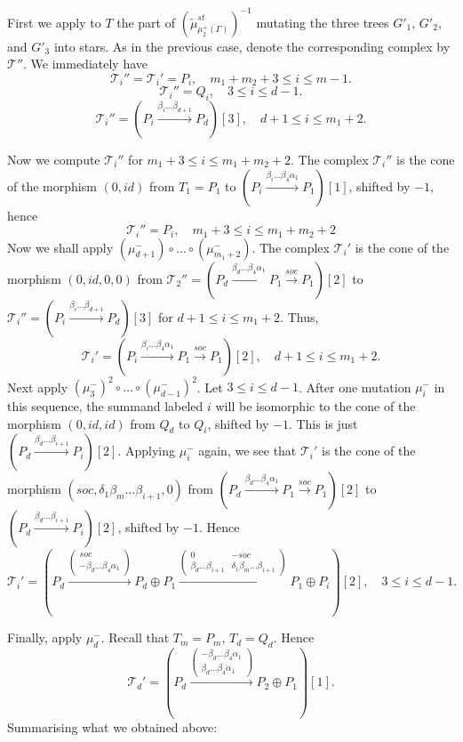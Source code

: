 \documentclass[12pt]{amsart}
\theoremstyle{plain}
\theoremstyle{remark}
\theoremstyle{definition}
\begin{document}
\begin{enumerate}
\begin{enumerate}
     First we apply to $T$ the part of $(\widetilde{\mu}_{\mu_2^+(\Gamma)}^{st})^{-1}$ mutating the three trees $G'_1$, $G'_2$, and $G'_3$ into stars. As in the previous case, denote the corresponding complex by $\mathcal{T}''$. We immediately have
     $$\mathcal{T}_i'' = \mathcal{T}_i' = P_i, \quad m_1+m_2+3 \leq i \leq m-1. $$
     $$\mathcal{T}_i'' = Q_i, \quad 3 \leq i \leq d-1. $$
     $$\mathcal{T}_i'' = (P_i \xrightarrow{\beta_i \dots \beta_{d+1}} P_d)[3], \quad d+1 \leq i \leq m_1+2.$$
    
Now we compute $\mathcal{T}_i''$ for $m_1+3 \leq i \leq m_1 + m_2+2$. The complex $\mathcal{T}_{i}''$ is the cone of the morphism $(0, id)$ from $T_1 = P_1$ to $(P_i \xrightarrow{\beta_i \dots \beta_4\alpha_1} P_1)[1]$, shifted by $-1$, hence 
$$\mathcal{T}_i'' = P_i, \quad m_1+3 \leq i \leq m_1+m_2+2 $$
Now we shall apply $(\mu_{d+1}^-) \circ \dots \circ (\mu_{m_1+2}^-)$. The complex
$\mathcal{T}_i'$ is the cone of the morphism $(0, id, 0, 0)$ from ${\mathcal{T}_{2}'' = (P_d \xrightarrow{\beta_d \dots \beta_4\alpha_1} P_1 \xrightarrow{soc} P_1)[2]}$ to ${\mathcal{T}_i'' = (P_i \xrightarrow{\beta_i \dots \beta_{d+1}} P_d)[3]}$ for ${d+1 \leq i \leq m_1+2}$. Thus,
$$\mathcal{T}_i' = (P_i \xrightarrow{\beta_i \dots \beta_4 \alpha_1} P_1 \xrightarrow{soc} P_1)[2], \quad d+1 \leq i \leq m_1+2. $$
Next apply $(\mu_3^-)^2 \circ \dots \circ (\mu_{d-1}^-)^2$. Let $3 \leq i \leq d-1$. After one  mutation $\mu_i^{-}$ in this sequence, the summand labeled $i$ will be isomorphic to the cone of the morphism $(0,id,id)$ from $Q_d$ to $Q_i$, shifted by $-1$. This is just $(P_d \xrightarrow{\beta_d \dots \beta_{i+1}} P_i)[2]$. Applying $\mu_i^-$ again, we see that $\mathcal{T}_i'$ is the cone of the morphism $(soc,\delta_1\beta_m\dots\beta_{i+1},0)$ from $(P_d \xrightarrow{\beta_d \dots \beta_{4}\alpha_1} P_1 \xrightarrow{soc} P_1)[2]$ to $(P_d \xrightarrow{\beta_d \dots \beta_{i+1}} P_i)[2]$, shifted by $-1$. 
Hence 
$$\mathcal{T}_i' = (P_d \xrightarrow{\begin{pmatrix} soc \\ -\beta_d \dots \beta_{4}\alpha_1 \end{pmatrix}} P_d \oplus P_1 \xrightarrow{\begin{pmatrix} 0 & -soc  \\ \beta_d \dots \beta_{i+1} &  \delta_1\beta_m \dots \beta_{i+1}  \end{pmatrix}} P_1\oplus P_i)[2], \quad 3 \leq i \leq d-1. $$

Finally, apply $\mu_d^-$. Recall that $T_{m}=P_{m}$, $T_d = Q_d$. Hence $${\mathcal{T}_d' = (P_d \xrightarrow{\begin{pmatrix} -\beta_d \dots \beta_4 \alpha_1 \\ \beta_d \dots \beta_4 \alpha_1 \end{pmatrix}} P_2\oplus P_1)[1]}.$$ Summarising what we obtained above: 


\end{enumerate}
\end{enumerate}
\end{document}
